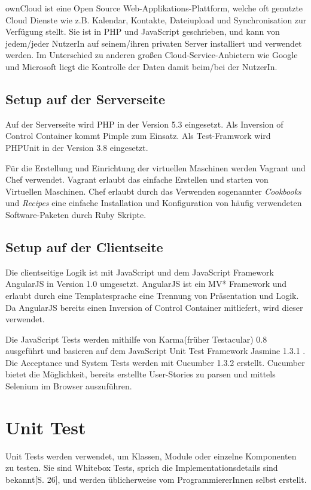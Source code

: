 \documentclass[a4paper,bibtotoc,oneside]{scrbook}
\begin{document}
ownCloud ist eine Open Source Web-Applikations-Plattform, welche oft genutzte Cloud Dienste wie z.B. Kalendar, Kontakte, Dateiupload und Synchronisation zur Verfügung stellt. Sie ist in PHP und JavaScript geschrieben, und kann von jedem/jeder NutzerIn auf seinem/ihren privaten Server installiert und verwendet werden. Im Unterschied zu anderen großen Cloud-Service-Anbietern wie Google und Microsoft liegt die Kontrolle der Daten damit beim/bei der NutzerIn.

\section{Setup auf der Serverseite}
Auf der Serverseite wird PHP in der Version 5.3 eingesetzt. Als Inversion of Control Container kommt Pimple\cite{pimple} zum Einsatz. Als Test-Framwork wird PHPUnit\cite{phpunit} in der Version 3.8 eingesetzt.

Für die Erstellung und Einrichtung der virtuellen Maschinen werden Vagrant\cite{vagrant} und Chef\cite{chef} verwendet. Vagrant erlaubt das einfache Erstellen und starten von Virtuellen Maschinen. Chef erlaubt durch das Verwenden sogenannter \emph{Cookbooks} und \emph{Recipes} eine einfache Installation und Konfiguration von häufig verwendeten Software-Paketen durch Ruby Skripte.

\section{Setup auf der Clientseite}
Die clientseitige Logik ist mit JavaScript und dem JavaScript Framework AngularJS\cite{angular} in Version 1.0 umgesetzt. AngularJS ist ein MV* Framework und erlaubt durch eine Templatesprache eine Trennung von Präsentation und Logik. Da AngularJS bereits einen Inversion of Control Container mitliefert, wird dieser verwendet.

Die JavaScript Tests werden mithilfe von Karma\cite{karma}(früher Testacular) 0.8 ausgeführt und basieren auf dem JavaScript Unit Test Framework Jasmine 1.3.1 \cite{jasmine}. Die Acceptance und System Tests werden mit Cucumber 1.3.2 \cite{cucumber} erstellt. Cucumber bietet die Möglichkeit, bereits erstellte User-Stories zu parsen und mittels Selenium im Browser auszuführen.


\chapter{Unit Test}
Unit Tests werden verwendet, um Klassen, Module oder einzelne Komponenten zu testen. Sie sind Whitebox Tests, sprich die Implementationsdetails sind bekannt\cite{betrieb}[S. 26], und werden üblicherweise vom ProgrammiererInnen selbst erstellt.
\end{document}
